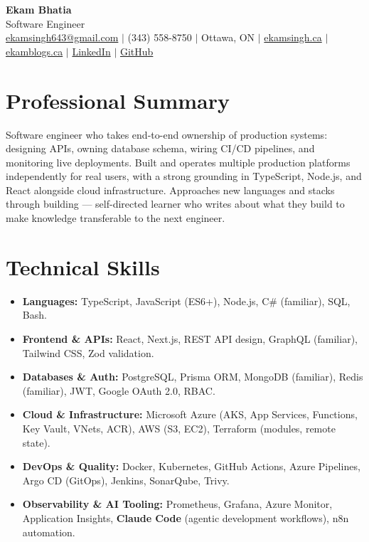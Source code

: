 \documentclass[11pt,a4paper]{article}
\begin{document}
\begin{center}
    {\LARGE \textbf{Ekam Bhatia}} \\
    \vspace{2pt}
    {\normalsize Software Engineer} \\
    \vspace{4pt}
    \small
    \href{mailto:ekamsingh643@gmail.com}{ekamsingh643@gmail.com} $|$
    (343) 558-8750 $|$ Ottawa, ON $|$
    \href{https://www.ekamsingh.ca}{ekamsingh.ca} $|$
    \href{https://www.ekamblogs.ca}{ekamblogs.ca} $|$
    \href{https://www.linkedin.com/in/ekam-bhatia-335840168}{LinkedIn} $|$
    \href{https://github.com/bhat0155}{GitHub}
\end{center}

\section{Professional Summary}
Software engineer who takes end-to-end ownership of production systems: designing APIs, owning database schema, wiring CI/CD pipelines, and monitoring live deployments. Built and operates multiple production platforms independently for real users, with a strong grounding in TypeScript, Node.js, and React alongside cloud infrastructure. Approaches new languages and stacks through building — self-directed learner who writes about what they build to make knowledge transferable to the next engineer.

\section{Technical Skills}
\begin{itemize}
    \item \textbf{Languages:} TypeScript, JavaScript (ES6+), Node.js, C\# (familiar), SQL, Bash.
    \item \textbf{Frontend \& APIs:} React, Next.js, REST API design, GraphQL (familiar), Tailwind CSS, Zod validation.
    \item \textbf{Databases \& Auth:} PostgreSQL, Prisma ORM, MongoDB (familiar), Redis (familiar), JWT, Google OAuth 2.0, RBAC.
    \item \textbf{Cloud \& Infrastructure:} Microsoft Azure (AKS, App Services, Functions, Key Vault, VNets, ACR), AWS (S3, EC2), Terraform (modules, remote state).
    \item \textbf{DevOps \& Quality:} Docker, Kubernetes, GitHub Actions, Azure Pipelines, Argo CD (GitOps), Jenkins, SonarQube, Trivy.
    \item \textbf{Observability \& AI Tooling:} Prometheus, Grafana, Azure Monitor, Application Insights, \textbf{Claude Code} (agentic development workflows), n8n automation.
\end{itemize}
\end{document}
